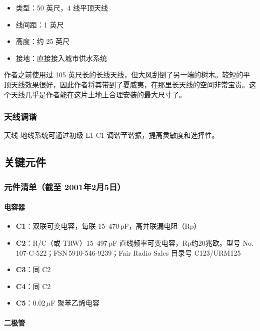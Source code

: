 \begin{itemize}[leftmargin=2cm]
    \item 类型：50 英尺，4 线平顶天线
    \item 线间距：1 英尺
    \item 高度：约 25 英尺
    \item 接地：直接接入城市供水系统
\end{itemize}

作者之前使用过 105 英尺长的长线天线，但大风刮倒了另一端的树木。较短的平顶天线效果很好，因此作者将其带到了夏威夷，在那里长天线的空间非常宝贵。这个天线几乎是作者能在这片土地上合理安装的最大尺寸了。

\subsubsection*{天线调谐}

天线-地线系统可通过初级 L1-C1 调谐至谐振，提高灵敏度和选择性。

\subsection{关键元件}
\label{subsec:lyonodyne_components}

\subsubsection*{元件清单（截至 2001年2月5日）}

\paragraph{电容器}

\begin{itemize}[leftmargin=2cm]
    \item \textbf{C1}：双联可变电容，每联 15--470\,pF，高并联漏电阻（Rp）
    \item \textbf{C2}：R/C（或 TRW）15--497\,pF 直线频率可变电容，Rp约20兆欧。型号 No.\,107-C-522；FSN\,5910-546-9239；Fair Radio Sales 目录号 C123/URM125
    \item \textbf{C3}：同 C2
    \item \textbf{C4}：同 C2
    \item \textbf{C5}：0.02\,$\mu$F 聚苯乙烯电容
\end{itemize}

\paragraph{二极管}


